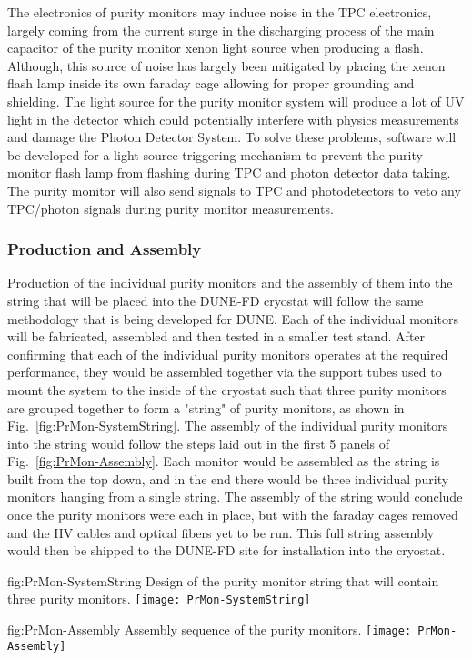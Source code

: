 The electronics of purity monitors may induce noise in the TPC electronics, largely coming from the current surge in the discharging process of the main capacitor of the purity monitor xenon light source when producing a flash.  Although, this source of noise has largely been mitigated by placing the xenon flash lamp inside its own faraday cage allowing for proper grounding and shielding.  The light source for the purity monitor system will produce a lot of UV light in the detector which could potentially interfere with physics measurements and damage the Photon Detector System. To solve these problems, software will be developed for a light source triggering mechanism to prevent the purity monitor flash lamp from flashing during TPC and photon detector data taking. The purity monitor will also send signals to TPC and photodetectors to veto any TPC/photon signals during purity monitor measurements. 


\subsubsection{Production and Assembly}
\label{sec:PrMon-Production-Assembly}
Production of the individual purity monitors and the assembly of them into the string that will be placed into the DUNE-FD cryostat will follow the same methodology that is being developed for DUNE.  Each of the individual monitors will be fabricated, assembled and then tested in a smaller test stand.  After confirming that each of the individual purity monitors operates at the required performance, they would be assembled together via the support tubes used to mount the system to the inside of the cryostat such that three purity monitors are grouped together to form a "string" of purity monitors, as shown in Fig.~\ref{fig:PrMon-SystemString}.  The assembly of the individual purity monitors into the string would follow the steps laid out in the first 5 panels of Fig.~\ref{fig:PrMon-Assembly}.  Each monitor would be assembled as the string is built from the top down, and in the end there would be three individual purity monitors hanging from a single string.  The assembly of the string would conclude once the purity monitors were each in place, but with the faraday cages removed and the HV cables and optical fibers yet to be run.  This full string assembly would then be shipped to the DUNE-FD site for installation into the cryostat.

\begin{dunefigure}{fig:PrMon-SystemString}
  {Design of the purity monitor string that will contain three purity monitors.}
  \texttt{[image: PrMon-SystemString]}
\end{dunefigure}

\begin{dunefigure}{fig:PrMon-Assembly}
  {Assembly sequence of the purity monitors.}
  \texttt{[image: PrMon-Assembly]}
\end{dunefigure}



